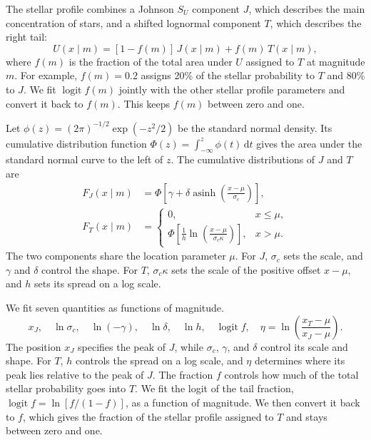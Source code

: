 The stellar profile combines a Johnson \(S_U\) component \(J\), which
describes the main concentration of stars, and a shifted lognormal
component \(T\), which describes the right tail:
\begin{equation}
 U(x\mid m)=[1-f(m)]\,J(x\mid m)+f(m)\,T(x\mid m),
 \label{eq:v12-stellar-profile}
\end{equation}
where \(f(m)\) is the fraction of the total area under \(U\) assigned
to \(T\) at magnitude \(m\). For example, \(f(m)=0.2\) assigns 20\%
of the stellar probability to \(T\) and 80\% to \(J\). We fit \(\operatorname{logit} f(m)\) jointly with the other stellar
profile parameters and convert it back to \(f(m)\). This keeps
\(f(m)\) between zero and one.

Let \(\phi(z)=(2\pi)^{-1/2}\exp(-z^2/2)\) be the standard normal
density. Its cumulative distribution function
\(\Phi(z)=\int_{-\infty}^{z}\phi(t)\,\mathrm{d}t\) gives the area
under the standard normal curve to the left of \(z\).
The cumulative distributions of \(J\) and \(T\) are
\begin{align}
 F_J(x\mid m) &=
 \Phi\!\left[\gamma+\delta\operatorname{asinh}
                 \!\left(\frac{x-\mu}{\sigma_c}\right)\right],\\
 F_T(x\mid m) &=
 \begin{cases}
 0, & x\leq\mu,\\[.15em]
 \displaystyle
 \Phi\!\left[\frac{1}{h}
             \ln\!\left(\frac{x-\mu}{\sigma_c\kappa}\right)\right],
                   & x>\mu.
 \end{cases}
 \label{eq:v12-stellar-cdf}
\end{align}
The two components share the location parameter \(\mu\). For \(J\),
\(\sigma_c\) sets the scale, and \(\gamma\) and \(\delta\) control
the shape. For \(T\), \(\sigma_c\kappa\) sets the scale of the
positive offset \(x-\mu\), and \(h\) sets its spread on a log scale.

We fit seven quantities as functions of magnitude.
\begin{equation}
 x_J,\quad \ln\sigma_c,\quad \ln(-\gamma),\quad
 \ln\delta,\quad\ln h,\quad\operatorname{logit}f,\quad
 \eta=\ln\!\left(\frac{x_T-\mu}{x_J-\mu}\right).
 \label{eq:v12-stellar-parameters}
\end{equation}
The position \(x_J\) specifies the peak of \(J\), while \(\sigma_c\),
\(\gamma\), and \(\delta\) control its scale and shape. For \(T\),
\(h\) controls the spread on a log scale, and \(\eta\) determines
where its peak lies relative to the peak of \(J\). The fraction \(f\)
controls how much of the total stellar probability goes into \(T\).
We fit the logit of the tail fraction,
\(\operatorname{logit}f=\ln[f/(1-f)]\), as a function of magnitude.
We then convert it back to \(f\), which gives the fraction of the
stellar profile assigned to \(T\) and stays between zero and one.

